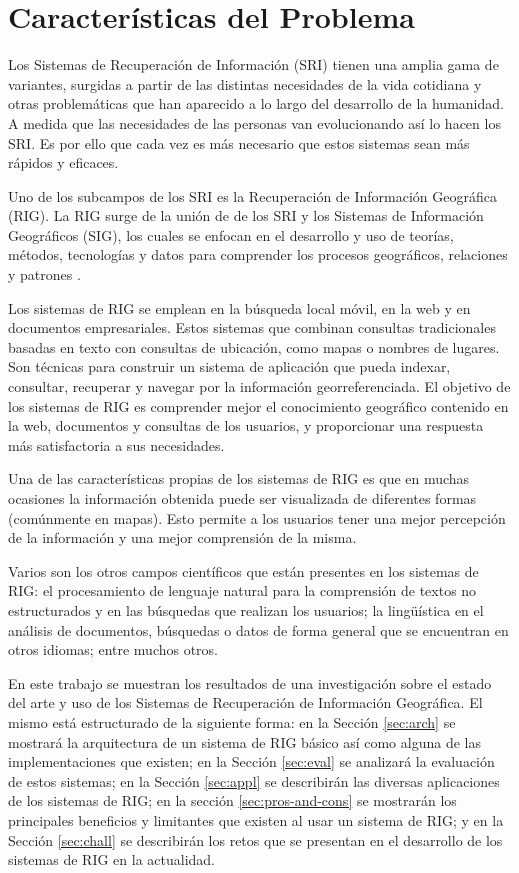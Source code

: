 \documentclass{llncs}
\begin{document}
\tableofcontents
\clearpage
\section{Características del Problema}\label{sec:prob-charact}

Los Sistemas de Recuperación de Información (SRI) tienen una amplia gama de
variantes, surgidas a partir de las distintas necesidades de la vida cotidiana
y otras problemáticas que han aparecido a lo largo del desarrollo de la
humanidad. A medida que las necesidades de las personas van evolucionando así
lo hacen los SRI. Es por ello que cada vez es más necesario que estos sistemas
sean más rápidos y eficaces.

Uno de los subcampos de los SRI es la Recuperación de Información Geográfica
(RIG). La RIG surge de la unión de de los SRI y los Sistemas de Información
Geográficos (SIG), los cuales se enfocan en el desarrollo y uso de teorías,
métodos, tecnologías y datos para comprender los procesos geográficos,
relaciones y patrones \cite{chang2016}.

Los sistemas de RIG se emplean en la búsqueda local móvil, en la web y en
documentos empresariales. Estos sistemas que combinan consultas tradicionales
basadas en texto con consultas de ubicación, como mapas o nombres de lugares.
Son técnicas para construir un sistema de aplicación que pueda indexar,
consultar, recuperar y navegar por la información georreferenciada. El objetivo
de los sistemas de RIG es comprender mejor el conocimiento geográfico contenido
en la web, documentos y consultas de los usuarios, y proporcionar una respuesta
más satisfactoria a sus necesidades.

Una de las características propias de los sistemas de RIG es que en muchas
ocasiones la información obtenida puede ser visualizada de diferentes formas
(comúnmente en mapas). Esto permite a los usuarios tener una mejor
percepción de la información y una mejor comprensión de la misma.

Varios son los otros campos científicos que están presentes en los sistemas de
RIG: el procesamiento de lenguaje natural para la comprensión de textos no
estructurados y en las búsquedas que realizan los usuarios; la lingüística en
el análisis de documentos, búsquedas o datos de forma general que se encuentran
en otros idiomas; entre muchos otros.

En este trabajo se muestran los resultados de una investigación sobre el estado
del arte y uso de los Sistemas de Recuperación de Información Geográfica. El
mismo está estructurado de la siguiente forma: en la Sección \ref{sec:arch} se
mostrará la arquitectura de un sistema de RIG básico así como alguna de las
implementaciones que existen; en la Sección \ref{sec:eval} se analizará la
evaluación de estos sistemas; en la Sección \ref{sec:appl} se describirán las
diversas aplicaciones de los sistemas de RIG; en la sección
\ref{sec:pros-and-cons} se mostrarán los principales beneficios y limitantes
que existen al usar un sistema de RIG; y en la Sección \ref{sec:chall} se
describirán los retos que se presentan en el desarrollo de los sistemas de RIG
en la actualidad.
\end{document}
